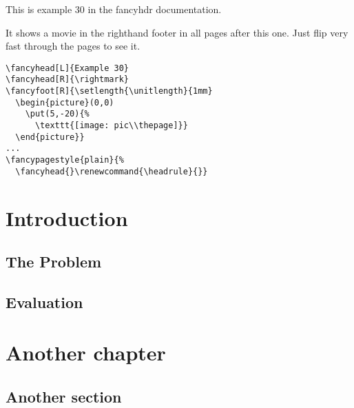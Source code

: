 \documentclass{report}
\begin{document}
\thispagestyle{plain}
\tableofcontents

\bigskip

\noindent
\begin{boxedminipage}{\textwidth}
This is example 30 in the fancyhdr documentation.

It shows a movie in the righthand footer in all pages after this one. Just flip very fast through the pages to see it.

\begin{verbatim}
\fancyhead[L]{Example 30}
\fancyhead[R]{\rightmark}
\fancyfoot[R]{\setlength{\unitlength}{1mm}
  \begin{picture}(0,0)
    \put(5,-20){%
      \texttt{[image: pic\\thepage]}}
  \end{picture}}
...
\fancypagestyle{plain}{%
  \fancyhead{}\renewcommand{\headrule}{}}
\end{verbatim}

\end{boxedminipage}

\newpage

\pagestyle{fancy}
\chapter{Introduction}

\lipsum[1-4]

\section{The Problem}
\label{sec:problem}

  \lipsum

\section{Evaluation}

\lipsum[3-6]

\chapter{Another chapter}

\label{cha:another-chapter}

\lipsum

\section{Another section}

\lipsum[3-4]
\end{document}
